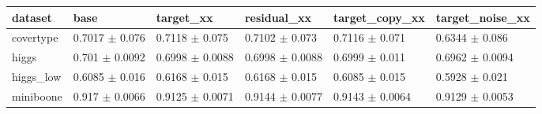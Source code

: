 \begin{tabular}{llllll}
\toprule
dataset & base & target\_xx & residual\_xx & target\_copy\_xx & target\_noise\_xx \\
\midrule
covertype & 0.7017 $\pm$ 0.076 & 0.7118 $\pm$ 0.075 & 0.7102 $\pm$ 0.073 & 0.7116 $\pm$ 0.071 & 0.6344 $\pm$ 0.086 \\
higgs & 0.701 $\pm$ 0.0092 & 0.6998 $\pm$ 0.0088 & 0.6998 $\pm$ 0.0088 & 0.6999 $\pm$ 0.011 & 0.6962 $\pm$ 0.0094 \\
higgs\_low & 0.6085 $\pm$ 0.016 & 0.6168 $\pm$ 0.015 & 0.6168 $\pm$ 0.015 & 0.6085 $\pm$ 0.015 & 0.5928 $\pm$ 0.021 \\
miniboone & 0.917 $\pm$ 0.0066 & 0.9125 $\pm$ 0.0071 & 0.9144 $\pm$ 0.0077 & 0.9143 $\pm$ 0.0064 & 0.9129 $\pm$ 0.0053 \\
\bottomrule
\end{tabular}
